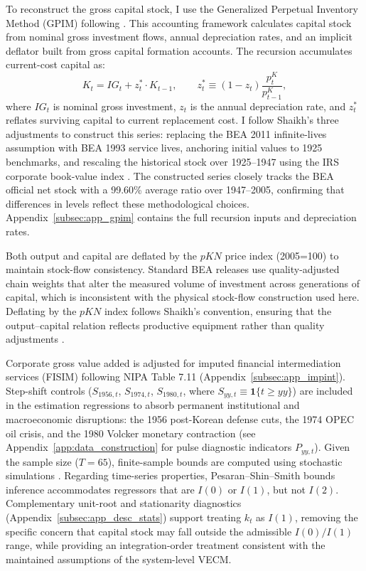 To reconstruct the gross capital stock, I use the Generalized Perpetual Inventory Method (GPIM) following \citet{Shaikh2016}. This accounting framework calculates capital stock from nominal gross investment flows, annual depreciation rates, and an implicit deflator built from gross capital formation accounts. The recursion accumulates current-cost capital as:
\begin{equation}
K_t = IG_t + z_t^* \cdot K_{t-1},
\qquad
z_t^* \equiv (1 - z_t) \frac{p^K_t}{p^K_{t-1}},
\end{equation}
where $IG_t$ is nominal gross investment, $z_t$ is the annual depreciation rate, and $z_t^*$ reflates surviving capital to current replacement cost. I follow Shaikh's three adjustments to construct this series: replacing the BEA 2011 infinite-lives assumption with BEA 1993 service lives, anchoring initial values to 1925 benchmarks, and rescaling the historical stock over 1925--1947 using the IRS corporate book-value index \citep[Appendix~6.7]{Shaikh2016}. The constructed series closely tracks the BEA official net stock with a 99.60\% average ratio over 1947--2005, confirming that differences in levels reflect these methodological choices. Appendix~\ref{subsec:app_gpim} contains the full recursion inputs and depreciation rates.

Both output and capital are deflated by the $pKN$ price index (2005=100) to maintain stock-flow consistency. Standard BEA releases use quality-adjusted chain weights that alter the measured volume of investment across generations of capital, which is inconsistent with the physical stock-flow construction used here. Deflating by the $pKN$ index follows Shaikh's convention, ensuring that the output--capital relation reflects productive equipment rather than quality adjustments \citep[Appendix~6.6]{Shaikh2016}.

Corporate gross value added is adjusted for imputed financial intermediation services (FISIM) following NIPA Table 7.11 (Appendix~\ref{subsec:app_impint}). Step-shift controls ($S_{1956,t}$, $S_{1974,t}$, $S_{1980,t}$, where $S_{yy,t} \equiv \mathbf{1}\{t \ge yy\}$) are included in the estimation regressions to absorb permanent institutional and macroeconomic disruptions: the 1956 post-Korean defense cuts, the 1974 OPEC oil crisis, and the 1980 Volcker monetary contraction (see Appendix~\ref{app:data_construction} for pulse diagnostic indicators $P_{yy,t}$). Given the sample size ($T = 65$), finite-sample bounds are computed using stochastic simulations \citep{NatsiopoulosTzeremes2022}. Regarding time-series properties, Pesaran--Shin--Smith bounds inference accommodates regressors that are $I(0)$ or $I(1)$, but not $I(2)$. Complementary unit-root and stationarity diagnostics (Appendix~\ref{subsec:app_desc_stats}) support treating $k_t$ as $I(1)$, removing the specific concern that capital stock may fall outside the admissible $I(0)/I(1)$ range, while providing an integration-order treatment consistent with the maintained assumptions of the system-level VECM.

